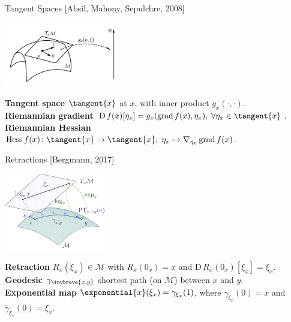 \documentclass[9.4pt]{beamer}
\begin{document}
\begin{frame}{Tangent Spaces}
    \vspace{-1\baselineskip}\hfill{\tiny{[Absil, Mahony, Sepulchre, 2008]}}
    \begin{center}
        \includegraphics[width=5cm]{img/Riemannian_Metric.png}
    \end{center}
    \textbf{Tangent space} $\tangent{x}$ at $x$, with inner product $g_x(\cdot, \cdot)$. \\[0.2\baselineskip]
    \textbf{Riemannian gradient} $\mathrm{D} \, f(x) [\eta_x] = g_x (\operatorname{grad} f(x), \eta_x), \; \forall \eta_x \in \tangent{x}$. \\[0.2\baselineskip]
    \textbf{Riemannian Hessian} $\operatorname{Hess} f(x) \colon \tangent{x} \to \tangent{x}, \; \eta_x \mapsto \nabla_{\eta_x} \operatorname{grad} f(x)$.
\end{frame}

\begin{frame}{Retractions}
    \vspace{-1\baselineskip}\hfill{\tiny{[Bergmann, 2017]}}
    \begin{center}
        \includegraphics[width=4.5cm]{img/manifold-terms.png}
    \end{center}
    \textbf{Retraction} $R_{x}(\xi_x) \in \mathcal{M}$ with $R_x (0_x) = x$ and $\mathrm{D} \, R_x (0_x)[\xi_x] = \xi_x$.
    \textbf{Geodesic} $\gamma_{\invbreve{x,y}}$ shortest path (on $\mathcal{M}$) between $x$ and $y$. \\[0.2\baselineskip]
    \textbf{Exponential map} $\exponential{x}(\xi_x) = \gamma_{\xi_x}(1)$, where $\gamma_{\xi_x}(0) = x$ and $\dot{\gamma}_{\xi_x}(0) = \xi_x$. \\[0.2\baselineskip]
\end{frame}
\end{document}
